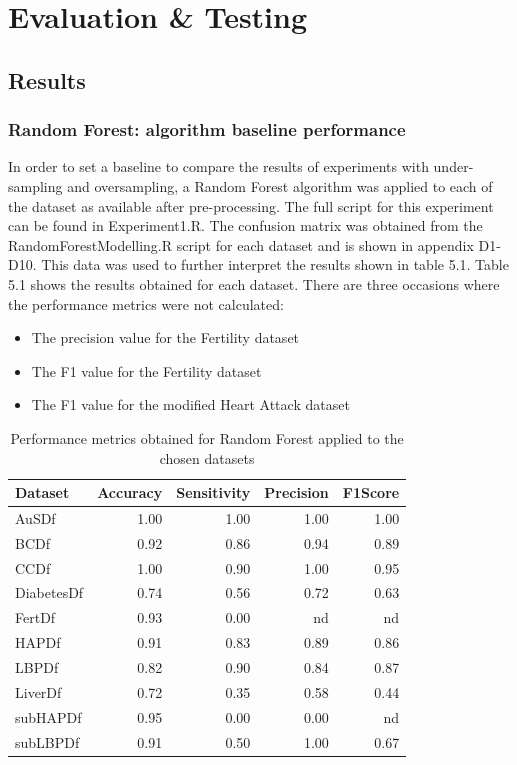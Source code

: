 \chapter{Evaluation \& Testing}\label{ch:Evaluation}
\section{Results}
\subsection{Random Forest: algorithm baseline performance}
In order to set a baseline to compare the results of experiments with under-sampling and oversampling, a Random Forest algorithm was applied to each of the dataset as available after pre-processing. The full script for this experiment can be found in Experiment1.R.\newline
The confusion matrix was obtained from the RandomForestModelling.R script for each dataset and is shown in appendix D1-D10. This data was used to further interpret the results shown in table 5.1.\newline
Table 5.1 shows the results obtained for each dataset. There are three occasions where the performance metrics were not calculated:
\begin{itemize}
    \item The precision value for the Fertility dataset
    \item The F1 value for the Fertility dataset
    \item The F1 value for the modified Heart Attack dataset
\end{itemize}

\begin{table}[!htbp]
\centering
\begin{tabular}{lrrrr}
  \hline
  \rowcolor{LightCyan}
Dataset & Accuracy & Sensitivity & Precision & F1Score \\ 
  \hline
AuSDf & 1.00 & 1.00 & 1.00 & 1.00 \\ 
  BCDf & 0.92 & 0.86 & 0.94 & 0.89 \\ 
  CCDf & 1.00 & 0.90 & 1.00 & 0.95 \\ 
  DiabetesDf & 0.74 & 0.56 & 0.72 & 0.63 \\ 
  FertDf & 0.93 & 0.00 & nd & nd \\ 
  HAPDf & 0.91 & 0.83 & 0.89 & 0.86 \\ 
  LBPDf & 0.82 & 0.90 & 0.84 & 0.87 \\ 
  LiverDf & 0.72 & 0.35 & 0.58 & 0.44 \\ 
  subHAPDf & 0.95 & 0.00 & 0.00 & nd \\ 
  subLBPDf & 0.91 & 0.50 & 1.00 & 0.67 \\ 
   \hline
\end{tabular}
\caption{Performance metrics obtained for Random Forest applied to the chosen datasets}
\end{table}

